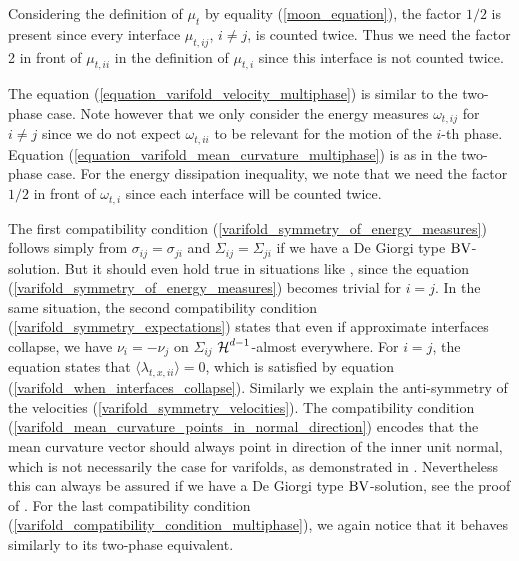 Considering the definition of $ \mu_{ t } $ by equality (\ref{moon_equation}), 
the factor $1/2$ is present since every 
interface $ \mu_{ t , i j } $, $ i \neq j $, is counted twice. Thus we need the 
factor 2 in front of $ \mu_{ t , i i } $ in the definition of $ \mu_{ t , i } $
since this interface is not counted twice.

The equation (\ref{equation_varifold_velocity_multiphase}) is similar to the 
two-phase case. Note however that we only consider the energy measures $ 
\omega_{ t , i j } $ for $ i \neq j $ since we do not expect $ \omega_{ t , i i 
} $ to be relevant for the motion of the $ i $-th phase. Equation
(\ref{equation_varifold_mean_curvature_multiphase}) is as in the two-phase 
case. For the energy dissipation inequality, we note that we need the factor $ 
1/2 $ in front of $ \omega_{ t , i } $ since each interface will be counted 
twice. 

The first compatibility condition (\ref{varifold_symmetry_of_energy_measures}) 
follows simply from $ \sigma_{ i j } = \sigma_{ j i }$ and $ \Sigma_{ i j } = 
\Sigma_{ j i } $ if we have a De Giorgi type $ \operatorname{BV} $-solution. But it should 
even 
hold true in situations like 
, since the equation 
(\ref{varifold_symmetry_of_energy_measures}) becomes trivial for $ i = 
j $. 
In the same situation, the second compatibility condition 
(\ref{varifold_symmetry_expectations}) states that even if approximate 
interfaces collapse, we have $ \nu_{ i } = - \nu_{ j } $ on $ \Sigma_{ i j } $ 
$ \operatorname{\mathcal{H}}^{ 
	d -1 } $-almost everywhere. For $ i = j $, the equation states that 
$ \langle \lambda_{ t , x , i i } \rangle = 0 $, which is satisfied by equation
(\ref{varifold_when_interfaces_collapse}). 
Similarly we explain the anti-symmetry of the velocities 
(\ref{varifold_symmetry_velocities}). The compatibility condition 
(\ref{varifold_mean_curvature_points_in_normal_direction}) encodes that the 
mean curvature vector should always point in direction of the inner unit 
normal, which is not necessarily the case for varifolds, as demonstrated in 
.
Nevertheless this can always be assured if we have a De Giorgi type $ \operatorname{BV} 
$-solution, see the proof of
. 
For the last compatibility condition 
(\ref{varifold_compatibility_condition_multiphase}), we again notice that it 
behaves similarly to its two-phase equivalent.

